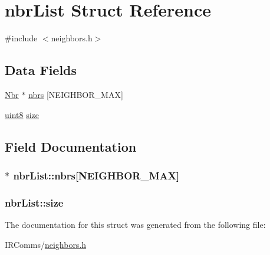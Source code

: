 \hypertarget{structnbr_list}{
\section{nbrList Struct Reference}
\label{structnbr_list}
}


{\ttfamily \#include $<$neighbors.h$>$}

\subsection*{Data Fields}
\begin{DoxyCompactItemize}
\item 
\hyperlink{structnbr}{Nbr} $\ast$ \hyperlink{structnbr_list_a0c65a631927fd86c38849f6e5653d2e2}{nbrs} \mbox{[}NEIGHBOR\_\-MAX\mbox{]}
\item 
\hyperlink{typedefs_8h_adde6aaee8457bee49c2a92621fe22b79}{uint8} \hyperlink{structnbr_list_a9d5fe63602b8ac946046c8e5df38c6bd}{size}
\end{DoxyCompactItemize}


\subsection{Field Documentation}
\hypertarget{structnbr_list_a0c65a631927fd86c38849f6e5653d2e2}{
\subsubsection[{nbrs}]{$\ast$ {\bf nbrList::nbrs}\mbox{[}NEIGHBOR\_\-MAX\mbox{]}}}
\label{structnbr_list_a0c65a631927fd86c38849f6e5653d2e2}
\hypertarget{structnbr_list_a9d5fe63602b8ac946046c8e5df38c6bd}{
\subsubsection[{size}]{ {\bf nbrList::size}}}
\label{structnbr_list_a9d5fe63602b8ac946046c8e5df38c6bd}


The documentation for this struct was generated from the following file:\begin{DoxyCompactItemize}
\item 
IRComms/\hyperlink{neighbors_8h}{neighbors.h}\end{DoxyCompactItemize}
